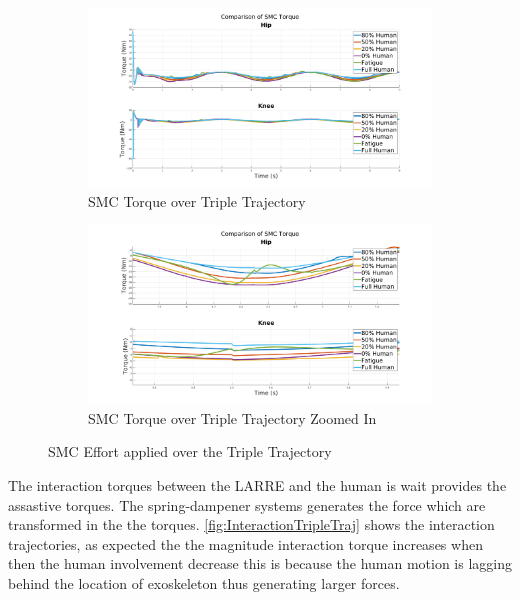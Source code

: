 \begin{figure}
    \begin{subfigure}{\linewidth}
        \centering
        \includegraphics[width=\columnwidth]{images/controllers/trajs/SMC_full.png}
        \caption[SMC Torque over Triple Trajectory]{SMC Torque over Triple Trajectory}
        \label{fig:SMCTripleFull}
    \end{subfigure}
    \begin{subfigure}{\linewidth}
        \centering
        \includegraphics[width=\columnwidth]{images/controllers/trajs/SMC_zoom.png}
        \caption[SMC Torque over Triple Trajectory Zoomed]{SMC Torque over Triple Trajectory Zoomed In}
        \label{fig:SMCTripleZoom}
    \end{subfigure}
    \caption{SMC Effort applied over the Triple Trajectory}
    \label{fig:SMCEffortTriple}
\end{figure}

The interaction torques between the LARRE and the human is wait provides the assastive torques. The spring-dampener systems generates the force which are transformed in the the torques. \autoref{fig:InteractionTripleTraj} shows the interaction trajectories, as expected the the magnitude interaction torque increases when then the human involvement decrease this is because the human motion is lagging behind the location of exoskeleton thus generating larger forces. 

